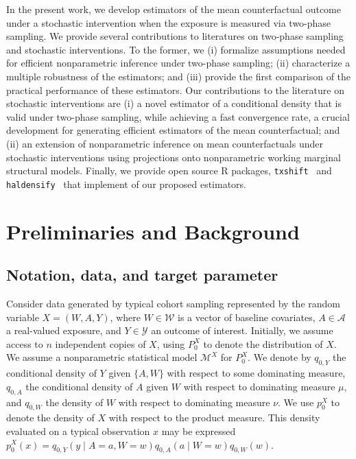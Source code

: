 In the present work, we develop estimators of the mean counterfactual outcome
under a stochastic intervention when the exposure is measured via two-phase
sampling. We provide several contributions to literatures on two-phase sampling
and stochastic interventions. To the former, we (i) formalize assumptions needed
for efficient nonparametric inference under two-phase sampling; (ii)
characterize a multiple robustness of the estimators; and (iii) provide the
first comparison of the practical performance of these estimators. Our
contributions to the literature on stochastic interventions are (i) a novel
estimator of a conditional density that is valid under two-phase sampling, while
achieving a fast convergence rate, a crucial development for generating
efficient estimators of the mean counterfactual; and (ii) an extension of
nonparametric inference on mean counterfactuals under stochastic interventions
using projections onto nonparametric working marginal structural models.
Finally, we provide open source R packages,
\texttt{txshift}~\citep{hejazi2020txshift, hejazi2020txshift-joss} and
\texttt{haldensify}~\citep{hejazi2020haldensify} that implement of our proposed
estimators.

\section{Preliminaries and Background}\label{background}

\subsection{Notation, data, and target parameter}\label{parameter}

Consider data generated by typical cohort sampling represented by the random
variable $X = (W, A, Y)$, where $W \in \mathcal{W}$ is a vector of baseline
covariates, $A \in \mathcal{A}$ a real-valued exposure, and $Y \in \mathcal{Y}$
an outcome of interest. Initially, we assume access to $n$ independent copies of
$X$, using $P_0^X$ to denote the distribution of $X$. We assume a nonparametric
statistical model $\mathcal{M}^X$ for $P_0^X$. We denote by $q_{0, Y}$ the
conditional density of $Y$ given $\{A, W\}$ with respect to some dominating
measure, $q_{0, A}$ the conditional density of $A$ given $W$ with respect to
dominating measure $\mu$, and $q_{0, W}$ the density of $W$ with respect to
dominating measure $\nu$. We use $p_0^X$ to denote the density of $X$ with
respect to the product measure. This density evaluated on a typical observation
$x$ may be expressed $p_0^X(x) = q_{0,Y}(y \mid A = a, W = w) q_{0,A}(a \mid
W = w) q_{0,W}(w)$.

